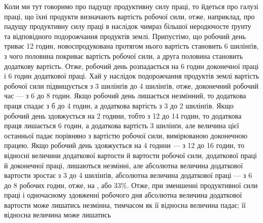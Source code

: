 Коли ми тут говоримо про падущу продуктивну силу праці,
то йдеться про галузі праці, що їхні продукти визначають вартість
робочої сили, отже, наприклад, про падущу продуктивну силу
праці в наслідок чимраз більшої неродючосте ґрунту та відповідного
подорожчання продуктів землі. Припустімо, що робочий
день триває 12 годин, новоспродукована протягом нього вартість
становить 6 шилінґів, з чого половина покриває вартість робочої
сили, а друга половина становить додаткову вартість. Отже,
робочий день розпадається на 6 годин доконечної праці і 6 годин
додаткової праці. Хай у наслідок подорожчання продуктів землі
вартість робочої сили підвищується з 3 шилінґів до 4 шилінґів,
отже, доконечний робочий час — з 6 до 8 годин. Якщо робочий
день лишається незмінний, то додаткова праця спадає з б до 4 годин,
а додаткова вартість з 3 до 2 шилінґів. Якщо робочий день
здовжується на 2 години, тобто з 12 до 14 годин, то додаткова
праця лишається 6 годин, а додаткова вартість 3 шилінґи, але
величина цієї останньої падає порівняно з вартістю робочої сили,
вимірюваною доконечною працею. Якщо робочий день здовжується
на 4 години — з 12 до 16 годин, то відносні величини додаткової
вартости й вартости робочої сили, додаткової праці й
доконечної праці, лишаються незмінні, але абсолютна величина
додаткової вартости зростає з 3 до 4 шилінґів, абсолютна величина
додаткової праці — з 6 до 8 робочих годин, отже, на ,
або 33\%. Отже, при зменшенні продуктивної сили праці
і одночасному здовженні робочого дня абсолютна величина
додаткової вартости може лишатись незмінна, тимчасом як її
відносна величина падає; її відносна величина може лишатись
\parbreak{}  %
